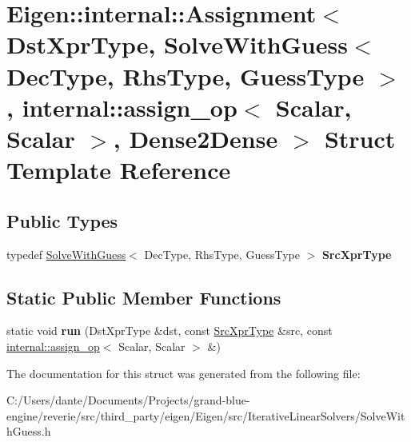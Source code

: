 \hypertarget{struct_eigen_1_1internal_1_1_assignment_3_01_dst_xpr_type_00_01_solve_with_guess_3_01_dec_type_092a64ffd1d5684a219c114a5d8922118}{}\section{Eigen\+::internal\+::Assignment$<$ Dst\+Xpr\+Type, Solve\+With\+Guess$<$ Dec\+Type, Rhs\+Type, Guess\+Type $>$, internal\+::assign\+\_\+op$<$ Scalar, Scalar $>$, Dense2\+Dense $>$ Struct Template Reference}
\label{struct_eigen_1_1internal_1_1_assignment_3_01_dst_xpr_type_00_01_solve_with_guess_3_01_dec_type_092a64ffd1d5684a219c114a5d8922118}
\subsection*{Public Types}
\begin{DoxyCompactItemize}
\item 
\mbox{\label{struct_eigen_1_1internal_1_1_assignment_3_01_dst_xpr_type_00_01_solve_with_guess_3_01_dec_type_092a64ffd1d5684a219c114a5d8922118_affc5272654093c02547a24c799bc6847}} 
typedef \mbox{\hyperlink{class_eigen_1_1_solve_with_guess}{Solve\+With\+Guess}}$<$ Dec\+Type, Rhs\+Type, Guess\+Type $>$ {\bfseries Src\+Xpr\+Type}
\end{DoxyCompactItemize}
\subsection*{Static Public Member Functions}
\begin{DoxyCompactItemize}
\item 
\mbox{\label{struct_eigen_1_1internal_1_1_assignment_3_01_dst_xpr_type_00_01_solve_with_guess_3_01_dec_type_092a64ffd1d5684a219c114a5d8922118_a0eef72c6336c71b4ffb879fae3b8fdf5}} 
static void {\bfseries run} (Dst\+Xpr\+Type \&dst, const \mbox{\hyperlink{class_eigen_1_1_solve_with_guess}{Src\+Xpr\+Type}} \&src, const \mbox{\hyperlink{struct_eigen_1_1internal_1_1assign__op}{internal\+::assign\+\_\+op}}$<$ Scalar, Scalar $>$ \&)
\end{DoxyCompactItemize}


The documentation for this struct was generated from the following file\+:\begin{DoxyCompactItemize}
\item 
C\+:/\+Users/dante/\+Documents/\+Projects/grand-\/blue-\/engine/reverie/src/third\+\_\+party/eigen/\+Eigen/src/\+Iterative\+Linear\+Solvers/Solve\+With\+Guess.\+h\end{DoxyCompactItemize}
